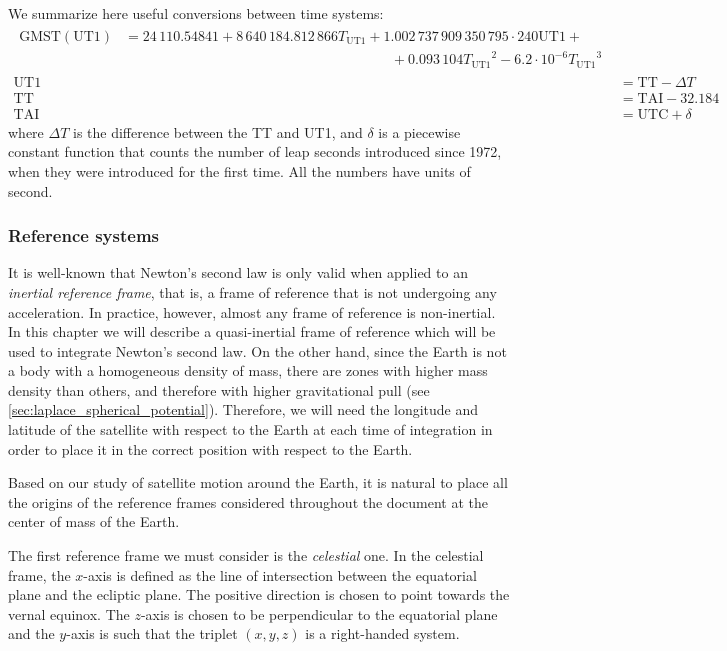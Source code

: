 \documentclass[../main.tex]{subfiles}
\begin{document}
We summarize here useful conversions between time systems:
\begin{align*}
  \begin{split}
    \mathrm{GMST}(\mathrm{UT1})&=24\,110.54841+8\,640\,184.812\,866{T_{\text{UT1}}}+1.002\,737\,909\,350\,795\cdot240\text{UT1}+\\
    &\hspace{8cm}+0.093\,104{T_{\text{UT1}}}^2-{6.2\cdot 10^{-6}}{T_{\text{UT1}}}^3
  \end{split} \\
  \text{UT1} & =\text{TT}-\Delta T                                                                                                         \\
  \text{TT}  & =\text{TAI}-32.184                                                                                                          \\
  \text{TAI} & =\text{UTC}+\delta
\end{align*}
where $\Delta T$ is the difference between the TT and UT1, and $\delta$ is a piecewise constant function that counts the number of leap seconds introduced since 1972, when they were introduced for the first time. All the numbers have units of second.
\subsubsection{Reference systems}\label{sec:reference_systems}
It is well-known that Newton's second law is only valid when applied to an \emph{inertial reference frame}, that is, a frame of reference that is not undergoing any acceleration. In practice, however, almost any frame of reference is non-inertial. In this chapter we will describe a quasi-inertial frame of reference which will be used to integrate Newton's second law. On the other hand, since the Earth is not a body with a homogeneous density of mass, there are zones with higher mass density than others, and therefore with higher gravitational pull (see \cref{sec:laplace_spherical_potential}). Therefore, we will need the longitude and latitude of the satellite with respect to the Earth at each time of integration in order to place it in the correct position with respect to the Earth.

Based on our study of satellite motion around the Earth, it is natural to place all the origins of the reference frames considered throughout the document at the center of mass of the Earth.

The first reference frame we must consider is the \emph{celestial} one. In the celestial frame, the $x$-axis is defined as the line of intersection between the equatorial plane and the ecliptic plane. The positive direction is chosen to point towards the vernal equinox. The $z$-axis is chosen to be perpendicular to the equatorial plane and the $y$-axis is such that the triplet $(x,y,z)$ is a right-handed system.
\end{document}
